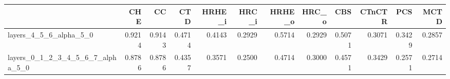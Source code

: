 \begin{tabular}{lrrrrrrrrrrr}
\toprule
 & CHE & CC & CTD & HRHE_i & HRC_i & HRHE_o & HRC_o & CBS & CTnCTR & PCS & MCTD \\
\midrule
layers_4_5_6_alpha_5_0 & 0.9214 & 0.9143 & 0.4714 & 0.4143 & 0.2929 & 0.5714 & 0.2929 & 0.5071 & 0.3071 & 0.3429 & 0.2857 \\
layers_0_1_2_3_4_5_6_7_alpha_5_0 & 0.8786 & 0.8786 & 0.4357 & 0.3571 & 0.2500 & 0.4714 & 0.3000 & 0.4571 & 0.3429 & 0.2571 & 0.2714 \\
\bottomrule
\end{tabular}
